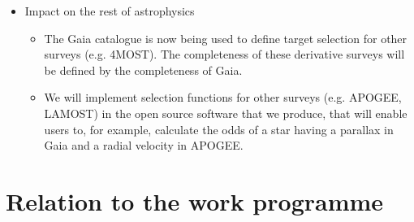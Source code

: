 \begin{itemize}
\begin{itemize}
        \end{itemize}
    \item Impact on the rest of astrophysics
        \begin{itemize}
            \item The Gaia catalogue is now being used to define target selection for other surveys (e.g. 4MOST). The completeness of these derivative surveys will be defined by the completeness of Gaia.
            \item We will implement selection functions for other surveys (e.g. APOGEE, LAMOST) in the open source software that we produce, that will enable users to, for example, calculate the odds of a star having a parallax in Gaia and a radial velocity in APOGEE.
        \end{itemize}
\end{itemize}

\section{Relation to the work programme}
\label{sec:relation-to-work-programme}

